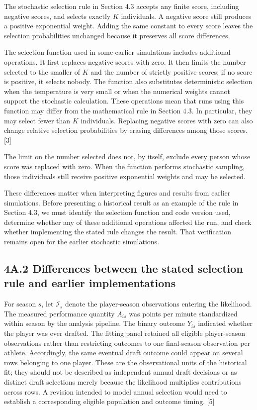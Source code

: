 The stochastic selection rule in Section 4.3 accepts any finite score, including negative scores, and selects exactly \(K\) individuals. A negative score still produces a positive exponential weight. Adding the same constant to every score leaves the selection probabilities unchanged because it preserves all score differences.

The selection function used in some earlier simulations includes additional operations. It first replaces negative scores with zero. It then limits the number selected to the smaller of \(K\) and the number of strictly positive scores; if no score is positive, it selects nobody. The function also substitutes deterministic selection when the temperature is very small or when the numerical weights cannot support the stochastic calculation. These operations mean that runs using this function may differ from the mathematical rule in Section 4.3. In particular, they may select fewer than \(K\) individuals. Replacing negative scores with zero can also change relative selection probabilities by erasing differences among those scores. {[}3{]}

The limit on the number selected does not, by itself, exclude every person whose score was replaced with zero. When the function performs stochastic sampling, those individuals still receive positive exponential weights and may be selected.

These differences matter when interpreting figures and results from earlier simulations. Before presenting a historical result as an example of the rule in Section 4.3, we must identify the selection function and code version used, determine whether any of these additional operations affected the run, and check whether implementing the stated rule changes the result. That verification remains open for the earlier stochastic simulations.

\subsection*{4A.2 Differences between the stated selection rule and earlier implementations}\label{a.2-differences-between-the-stated-selection-rule-and-earlier-implementations}

For season \(s\), let \(\mathcal{I}_{s}\) denote the player-season observations entering the likelihood. The measured performance quantity \(A_{is}\) was points per minute standardized within season by the analysis pipeline. The binary outcome \(Y_{is}\) indicated whether the player was ever drafted. The fitting panel retained all eligible player-season observations rather than restricting outcomes to one final-season observation per athlete. Accordingly, the same eventual draft outcome could appear on several rows belonging to one player. These are the observational units of the historical fit; they should not be described as independent annual draft decisions or as distinct draft selections merely because the likelihood multiplies contributions across rows. A revision intended to model annual selection would need to establish a corresponding eligible population and outcome timing. {[}5{]}


